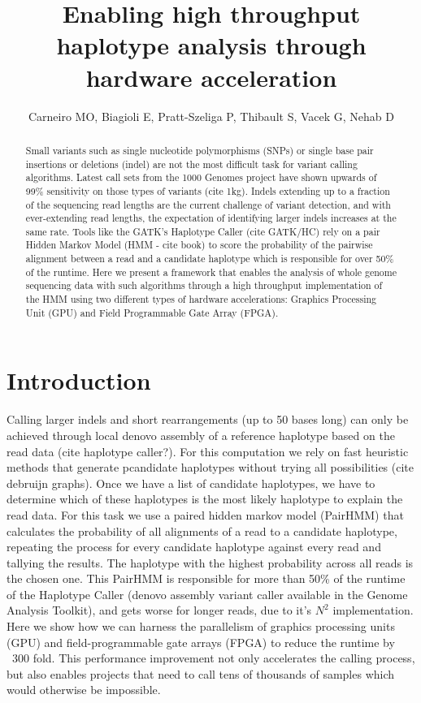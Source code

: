 \documentclass[11pt, oneside]{article}
\title{Enabling high throughput haplotype analysis through hardware acceleration}
\author{Carneiro MO, Biagioli E, Pratt-Szeliga P, Thibault S, Vacek G, Nehab D}
\begin{document}
 \maketitle
	
	\begin{abstract} 
	
	Small variants such as single nucleotide polymorphisms (SNPs) or single base
	pair insertions or deletions (indel) are not the most difficult task for
	variant calling algorithms. Latest call sets from the 1000 Genomes project
	have shown upwards of 99\% sensitivity on those types of variants (cite
	1kg). Indels extending up to a fraction of the sequencing read lengths are
	the current challenge of variant detection, and with ever-extending read
	lengths, the expectation of identifying larger indels increases at the same
	rate. Tools like the GATK's Haplotype Caller (cite GATK/HC) rely on a pair
	Hidden Markov Model (HMM - cite book) to score the probability of the pairwise alignment
	between a read and a candidate haplotype which is responsible for over 50\%
	of the runtime. Here we present a framework that enables the analysis of
	whole genome sequencing data with such algorithms through a high throughput
	implementation of the HMM using two different types of hardware
	accelerations: Graphics Processing Unit (GPU) and Field Programmable Gate
	Array (FPGA).
	
	\end{abstract}

	\section{Introduction} 

	Calling larger indels and short rearrangements (up to 50 bases
	long) can only be achieved through local denovo assembly of a
	reference haplotype based on the read data (cite haplotype caller?).
	For this computation we rely on fast heuristic methods that generate
	pcandidate haplotypes without trying all possibilities (cite debruijn
	graphs). Once we have a list of candidate haplotypes, we
	have to determine which of these haplotypes is the most likely
	haplotype to explain the read data. For this task we use a paired
	hidden markov model (PairHMM) that calculates the probability of
	all alignments of a read to a candidate haplotype, repeating the
	process for every candidate haplotype against every read and
	tallying the results. The haplotype with the highest probability
	across all reads is the chosen one. This PairHMM is responsible for
	more than 50\% of the runtime of the Haplotype Caller (denovo
	assembly variant caller available in the Genome Analysis
	Toolkit), and gets worse for longer reads, due to it's $N^2$ implementation. Here we show how
	we can harness the parallelism of graphics processing units (GPU)
	and field-programmable gate arrays (FPGA) to reduce the runtime by ~300
	fold. This performance improvement not only accelerates the calling process,
	but also enables projects that need to call tens of thousands of samples
	which would otherwise be impossible.  
	
\end{document}
